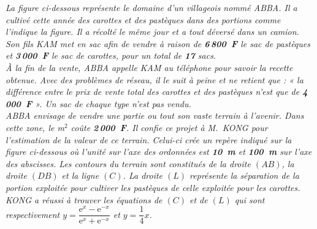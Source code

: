 \noindent\textit{La figure ci-dessous représente le domaine d'un villageois nommé ABBA. Il a cultivé cette
année des carottes et des pastèques dans des portions comme l'indique la figure. Il a récolté le
même jour et a tout déversé dans un camion. Son fils KAM met en sac afin de vendre à raison de
\textbf{6\,800~F} le sac de pastèques et \textbf{3\,000~F} le sac de carottes, pour un total de \textbf{17} sacs.}\\[2pt]
\noindent\textit{À la fin de la vente, ABBA appelle KAM au téléphone pour savoir la recette obtenue. Avec des
problèmes de réseau, il le suit à peine et ne retient que : « la différence entre le prix de vente
total des carottes et des pastèques n'est que de \textbf{4\,000~F} ». Un sac de chaque type n'est pas vendu.}\\[2pt]
\noindent\textit{ABBA envisage de vendre une partie ou tout son vaste terrain à l'avenir. Dans cette zone, le m$^2$
coûte \textbf{2\,000~F}. Il confie ce projet à M.~KONG pour l'estimation de la valeur de ce terrain.
Celui-ci crée un repère indiqué sur la figure ci-dessous où l'unité sur l'axe des ordonnées est
\textbf{10~m} et \textbf{100~m} sur l'axe des abscisses. Les contours du terrain sont constitués de la droite $(AB)$,
la droite $(DB)$ et la ligne $(C)$. La droite $(L)$ représente la séparation de la portion exploitée
pour cultiver les pastèques de celle exploitée pour les carottes. KONG a réussi à trouver les
équations de $(C)$ et de $(L)$ qui sont respectivement $y=\dfrac{\mathrm e^{x}-\mathrm e^{-x}}{\mathrm e^{x}+\mathrm e^{-x}}$ et $y=\dfrac14 x$.}

\begin{illus}
\end{illus}

